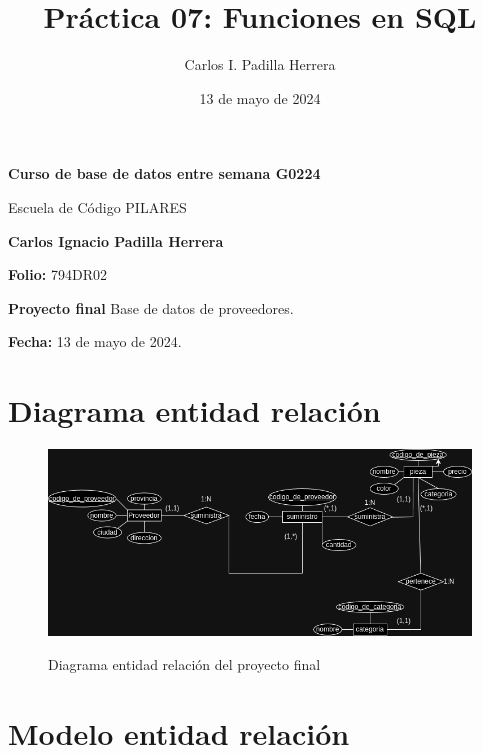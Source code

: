 \documentclass{article}
\title{Práctica 07: Funciones en SQL}
\author{Carlos I. Padilla Herrera}
\date{13 de mayo de 2024}
\begin{document}
\begin{titlepage}
    \centering
    \vspace*{1cm}
    \Huge\textbf{Curso de base de datos entre semana G0224}
    
    \vspace{0.5cm}
    \LARGE Escuela de Código PILARES
    
    \vspace{1.5cm}
    \textbf{Carlos Ignacio Padilla Herrera}
    
    \vspace{2cm}
    \Large\textbf{Folio:} 794DR02
    
    \vspace{0.5cm}
    \Large\textbf{Proyecto final} Base de datos de proveedores.
    
    \vfill
    
    \Large\textbf{Fecha:} 13 de mayo de 2024.
    
    \vspace{0.8cm}
\end{titlepage}

\newpage

\section*{Diagrama entidad relación}


\begin{figure}[ht]
    \centering
    {
        \includegraphics[width=\linewidth]{edc-proyecto-final.png} %
    }
    \caption{Diagrama entidad relación del proyecto final}
\end{figure}

\newpage


\section*{Modelo entidad relación}
\end{document}
